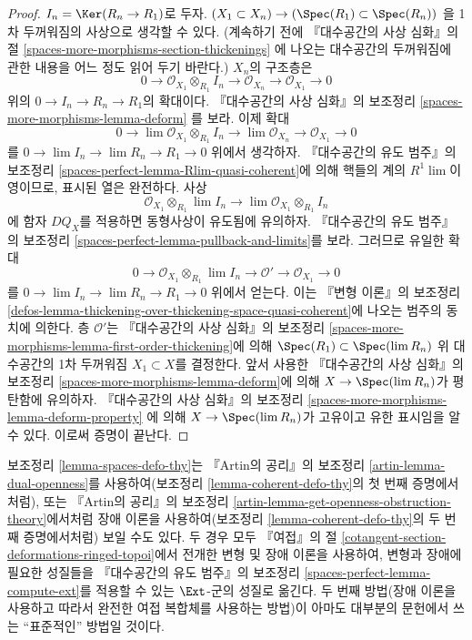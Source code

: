\begin{proof}
\medskip\noindent
$I_n = \Ker(R_n \to R_1)$로 두자.
$(X_1 \subset X_n) \to (\Spec(R_1) \subset \Spec(R_n))$
을 1차 두꺼워짐의 사상으로 생각할 수 있다. (계속하기 전에 『대수공간의
사상 심화』의 절
\ref{spaces-more-morphisms-section-thickenings}
에 나오는 대수공간의 두꺼워짐에 관한 내용을 어느 정도 읽어 두기 바란다.)
$X_n$의 구조층은
$$
0 \to \mathcal{O}_{X_1} \otimes_{R_1} I_n \to
\mathcal{O}_{X_n} \to \mathcal{O}_{X_1} \to 0
$$
위의 $0 \to I_n \to R_n \to R_1$의 확대이다. 『대수공간의 사상 심화』의
보조정리
\ref{spaces-more-morphisms-lemma-deform}
를 보라. 이제 확대
$$
0 \to \lim \mathcal{O}_{X_1} \otimes_{R_1} I_n \to
\lim \mathcal{O}_{X_n} \to \mathcal{O}_{X_1} \to 0
$$
를 $0 \to \lim I_n \to \lim R_n \to R_1 \to 0$ 위에서 생각하자.
『대수공간의 유도 범주』의 보조정리
\ref{spaces-perfect-lemma-Rlim-quasi-coherent}에 의해 핵들의 계의
$R^1\lim$이 영이므로, 표시된 열은 완전하다. 사상
$$
\mathcal{O}_{X_1} \otimes_{R_1} \lim I_n \longrightarrow
\lim \mathcal{O}_{X_1} \otimes_{R_1} I_n
$$
에 함자 $DQ_X$를 적용하면 동형사상이 유도됨에 유의하자. 『대수공간의
유도 범주』의 보조정리 \ref{spaces-perfect-lemma-pullback-and-limits}를 보라.
그러므로 유일한 확대
$$
0 \to \mathcal{O}_{X_1} \otimes_{R_1} \lim I_n \to
\mathcal{O}' \to \mathcal{O}_{X_1} \to 0
$$
를 $0 \to \lim I_n \to \lim R_n \to R_1 \to 0$ 위에서 얻는다. 이는
『변형 이론』의 보조정리
\ref{defos-lemma-thickening-over-thickening-space-quasi-coherent}에 나오는
범주의 동치에 의한다. 층 $\mathcal{O}'$는 『대수공간의 사상 심화』의 보조정리
\ref{spaces-more-morphisms-lemma-first-order-thickening}에 의해
$\Spec(R_1) \subset \Spec(\lim R_n)$ 위 대수공간의 1차 두꺼워짐
$X_1 \subset X$를 결정한다. 앞서 사용한 『대수공간의 사상 심화』의 보조정리
\ref{spaces-more-morphisms-lemma-deform}에 의해 $X \to \Spec(\lim R_n)$가
평탄함에 유의하자. 『대수공간의 사상 심화』의 보조정리
\ref{spaces-more-morphisms-lemma-deform-property}
에 의해 $X \to \Spec(\lim R_n)$가 고유이고 유한 표시임을 알 수 있다.
이로써 증명이 끝난다.
\end{proof}

\begin{remark}
\label{remark-spaces-defo-thy}
보조정리 \ref{lemma-spaces-defo-thy}는 『Artin의 공리』의 보조정리
\ref{artin-lemma-dual-openness}를 사용하여(보조정리
\ref{lemma-coherent-defo-thy}의 첫 번째 증명에서처럼), 또는 『Artin의 공리』의
보조정리 \ref{artin-lemma-get-openness-obstruction-theory}에서처럼 장애 이론을
사용하여(보조정리 \ref{lemma-coherent-defo-thy}의 두 번째 증명에서처럼)
보일 수도 있다. 두 경우 모두 『여접』의 절
\ref{cotangent-section-deformations-ringed-topoi}에서 전개한 변형 및 장애 이론을
사용하여, 변형과 장애에 필요한 성질들을 『대수공간의 유도 범주』의 보조정리
\ref{spaces-perfect-lemma-compute-ext}를 적용할 수 있는 $\Ext$-군의 성질로
옮긴다. 두 번째 방법(장애 이론을 사용하고 따라서 완전한 여접 복합체를 사용하는
방법)이 아마도 대부분의 문헌에서 쓰는 ``표준적인'' 방법일 것이다.
\end{remark}





